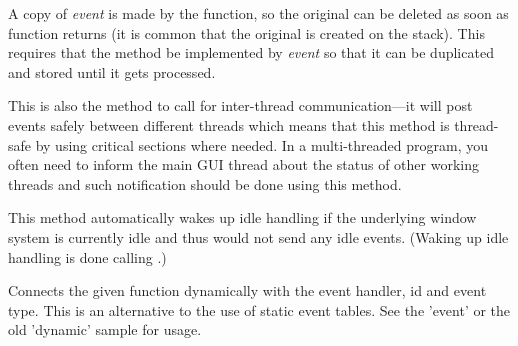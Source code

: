 A copy of {\it event} is made by the function, so the original can be deleted
as soon as function returns (it is common that the original is created on the
stack).  This requires that the  method
be implemented by {\it event} so that it can be duplicated and stored until
it gets processed.

This is also the method to call for inter-thread communication---it will
post events safely between different threads which means that this method is
thread-safe by using critical sections where needed.  In a multi-threaded
program, you often need to inform the main GUI thread about the status of
other working threads and such notification should be done using this method.

This method automatically wakes up idle handling if the underlying window 
system is currently idle and thus would not send any idle events. (Waking
up idle handling is done calling .)

\label{wxevthandlerconnect}



Connects the given function dynamically with the event handler, id and event type. This
is an alternative to the use of static event tables. See the 'event' or the old 'dynamic' sample for usage.








